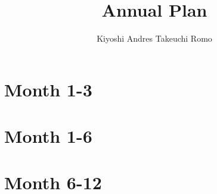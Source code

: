 \documentclass[a4paper]{article}
\title{Annual Plan}
\author{Kiyoshi Andres Takeuchi Romo}
\theoremstyle{theorem}
\theoremstyle{definition}
\theoremstyle{remark}
\theoremstyle{gremark}
\theoremstyle{discussion}
\theoremstyle{notation}
\begin{document}
	
	\maketitle
	
	
	\pagebreak
	
	\section*{Month 1-3}
	
	\section*{Month 1-6}
	
	\section*{Month 6-12}
	
	
	
	
	
\end{document}
